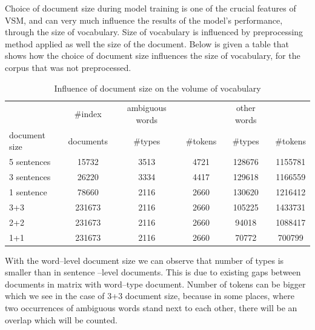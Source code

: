 Choice of document size during model training is one of the crucial features of VSM, and can very much 
influence the results of the model's performance, through the size of vocabulary. Size of vocabulary is 
influenced by 
preprocessing method applied as well the size of the document. Below is given a table that shows how 
the choice of document size influences the size of vocabulary, for the corpus that was not preprocessed. 

\begin{table}[h!]
\begin{tabular}{ l | c | c c |c c}\label{docSize}
			& \#index  &  ambiguous  words && other words \\
 document size & documents & \#types & \#tokens & \#types & \#tokens \\
\hline
5 sentences & 15732 & 3513 & 4721 & 128676 & 1155781\\
3 sentences & 26220 & 3334 & 4417 & 129618 & 1166559\\
1 sentence & 78660 & 2116 & 2660 & 130620 & 1216412\\
3+3 & 231673 & 2116 & 2660 & 105225 & 1433731\\
2+2 & 231673 & 2116 & 2660 & 94018 & 1088417\\
1+1 & 231673 & 2116 & 2660 & 70772 & 700799\\
\end{tabular}
\caption{Influence of document size on the volume of vocabulary}
\end{table}

With the word--level document size we can observe that number of types is smaller than in sentence
--level documents. This is due to existing gaps between documents in matrix with word--type document.
Number of tokens  can be bigger which we see in the case of 3+3 document size, because in some 
places, where two occurrences of ambiguous words stand next to each other, there will be an overlap
which will be counted. 

